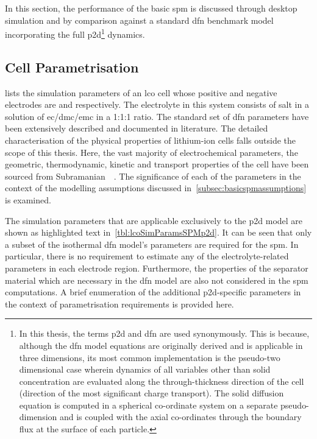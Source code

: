 
In this  section, the performance  of the  basic \gls{spm} is  discussed through
desktop  simulation and  by comparison  against a  standard \gls{dfn}  benchmark
model  incorporating  the  full  \gls{p2d}\footnote{In this  thesis,  the  terms
\gls{p2d} and  \gls{dfn} are  used synonymously. This  is because,  although the
\gls{dfn}  model equations  are originally  derived and  is applicable  in three
dimensions, its  most common implementation  is the pseudo-two  dimensional case
wherein dynamics of  all variables other than solid  concentration are evaluated
along  the  through-thickness direction  of  the  cell  (direction of  the  most
significant charge  transport). The  solid diffusion equation  is computed  in a
spherical co-ordinate system on a  separate pseudo-dimension and is coupled with
the  axial  co-ordinates through  the  boundary  flux  at  the surface  of  each
particle.} dynamics.

\subsection{Cell Parametrisation}\label{subsec:spmp2dparametrisation}


 lists  the simulation  parameters of  an \gls{lco}
cell  whose positive  and negative  electrodes are   and  
respectively.  The  electrolyte in  this  system  consists of    salt
in  a   solution  of   \gls{ec}/\gls{dmc}/\gls{emc}  in   a  1:1:1   ratio.  The
standard  set  of  \gls{dfn}  parameters have  been  extensively  described  and
documented  in  literature.  The   detailed  characterisation  of  the  physical
properties  of  lithium-ion  cells  falls  outside the  scope  of  this  thesis.
Here, the  vast majority  of electrochemical  parameters, \viz{}  the geometric,
thermodynamic, kinetic  and transport properties  of the cell have  been sourced
from  Subramanian~\etal{}~\cite{Subramanian2009}.   The  significance   of  each
of  the  parameters  in  the  context of  the  modelling  assumptions  discussed
in~\cref{subsec:basicspmassumptions} is examined.

The simulation parameters that are applicable exclusively to the \gls{p2d} model
are shown as  highlighted text in~\cref{tbl:lcoSimParamsSPMp2d}. It  can be seen
that only a  subset of the isothermal \gls{dfn} model's  parameters are required
for the \gls{spm}. In particular, there is no requirement to estimate any of the
electrolyte-related  parameters  in  each  electrode  region.  Furthermore,  the
properties of the separator material which  are necessary in the \gls{dfn} model
are also  not considered in the  \gls{spm} computations. A brief  enumeration of
the additional  \gls{p2d}-specific parameters in the  context of parametrisation
requirements is provided here.

